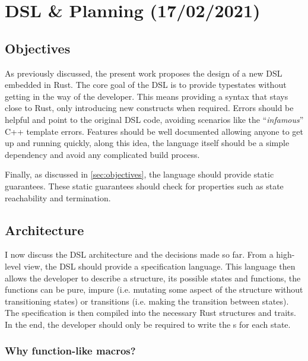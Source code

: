 \chapter{DSL \& Planning (17/02/2021)}\label{cha:planning}


\section{Objectives}

As previously discussed, the present work proposes the design of a new DSL embedded in Rust.
The core goal of the DSL is to provide typestates without getting in the way of the developer.
This means providing a syntax that stays close to Rust, only introducing new constructs when required.
Errors should be helpful and point to the original DSL code, avoiding scenarios like the “\emph{infamous}” C++ template errors.
Features should be well documented allowing anyone to get up and running quickly,
along this idea, the language itself should be a simple dependency and avoid any complicated build process.

Finally, as discussed in \autoref{sec:objectives}, the language should provide static guarantees.
These static guarantees should check for properties such as state reachability and termination.

\section{Architecture}

I now discuss the DSL architecture and the decisions made so far.
From a high-level view, the DSL should provide a specification language.
This language then allows the developer to describe a structure, its possible states and functions,
the functions can be pure, impure (i.e. mutating some aspect of the structure without transitioning states)
or transitions (i.e. making the transition between states).
The specification is then compiled into the necessary Rust structures and traits.
In the end, the developer should only be required to write the s for each state.

\subsection{Why function-like macros?}

